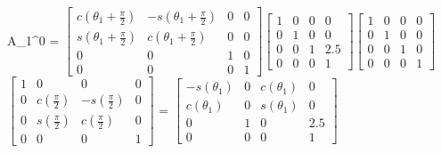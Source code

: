 \documentclass[12pt]{article}
\begin{document}
\begin{center}
    A_1^0 = $\left[\begin{matrix}c{\left(\theta_{1} + \frac{\pi}{2}\right)} & - s{\left(\theta_{1} + \frac{\pi}{2}\right)} & 0 & 0\\s{\left(\theta_{1} + \frac{\pi}{2}\right)} & c{\left(\theta_{1} + \frac{\pi}{2}\right)} & 0 & 0\\0 & 0 & 1 & 0\\0 & 0 & 0 & 1\end{matrix}\right]$$\left[\begin{matrix}1 & 0 & 0 & 0\\0 & 1 & 0 & 0\\0 & 0 & 1 & 2.5\\0 & 0 & 0 & 1\end{matrix}\right]$$\left[\begin{matrix}1 & 0 & 0 & 0\\0 & 1 & 0 & 0\\0 & 0 & 1 & 0\\0 & 0 & 0 & 1\end{matrix}\right]$$\left[\begin{matrix}1 & 0 & 0 & 0\\0 & c{\left(\frac{\pi}{2} \right)} & - s{\left(\frac{\pi}{2} \right)} & 0\\0 & s{\left(\frac{\pi}{2} \right)} & c{\left(\frac{\pi}{2} \right)} & 0\\0 & 0 & 0 & 1\end{matrix}\right]$\newline
    = $\left[\begin{matrix}- s{\left(\theta_{1} \right)} & 0 & c{\left(\theta_{1} \right)} & 0\\c{\left(\theta_{1} \right)} & 0 & s{\left(\theta_{1} \right)} & 0\\0 & 1 & 0 & 2.5\\0 & 0 & 0 & 1\end{matrix}\right]$\newline\newline
    

\end{center}
\end{document}
